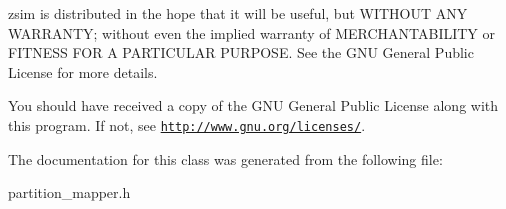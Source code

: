 zsim is distributed in the hope that it will be useful, but W\-I\-T\-H\-O\-U\-T A\-N\-Y W\-A\-R\-R\-A\-N\-T\-Y; without even the implied warranty of M\-E\-R\-C\-H\-A\-N\-T\-A\-B\-I\-L\-I\-T\-Y or F\-I\-T\-N\-E\-S\-S F\-O\-R A P\-A\-R\-T\-I\-C\-U\-L\-A\-R P\-U\-R\-P\-O\-S\-E. See the G\-N\-U General Public License for more details.

You should have received a copy of the G\-N\-U General Public License along with this program. If not, see \href{http://www.gnu.org/licenses/}{\tt http\-://www.\-gnu.\-org/licenses/}. 

The documentation for this class was generated from the following file\-:\begin{DoxyCompactItemize}
\item 
partition\-\_\-mapper.\-h\end{DoxyCompactItemize}
